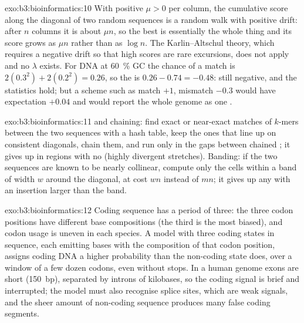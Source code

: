 \begin{solution}{exo:b3:bioinformatics:10}
With positive  $\mu > 0$ per column, the cumulative score
along the diagonal of two random sequences is a random walk with
positive drift: after $n$ columns it is about $\mu n$, so the best
 is essentially the whole thing and its score grows as
$\mu n$ rather than as $\log n$. The Karlin--Altschul theory, which
requires a negative drift so that high scores are rare excursions,
does not apply and no $\lambda$ exists. For DNA at \qty{60}{\%} GC the
chance of a match is $2(0.3^{2}) + 2(0.2^{2}) = 0.26$, so the  is $0.26 - 0.74 = -0.48$: still negative, and the statistics
hold; but a scheme such as match $+1$, mismatch $-0.3$ would have
expectation $+0.04$ and would report the whole genome as one .
\end{solution}

\begin{solution}{exo:b3:bioinformatics:11}
 and chaining: find exact or near-exact matches of $k$-mers between
the two sequences with a hash table, keep the ones that line up on
consistent diagonals, chain them, and run  only in
the gaps between chained ; it gives up  in regions with
no  (highly divergent stretches). Banding: if the two sequences are
known to be nearly collinear, compute only the cells within a band of
width $w$ around the diagonal, at cost $wn$ instead of $mn$; it gives
up any  with an insertion larger than the band.
\end{solution}

\begin{solution}{exo:b3:bioinformatics:12}
Coding sequence has a period of three: the three codon positions have
different base compositions (the third is the most biased), and codon
usage is uneven in each species. A model with three coding states in
sequence, each emitting bases with the composition of that codon
position, assigns coding DNA a higher probability than the non-coding
state does, over a window of a few dozen codons, even without stops.
In a human genome exons are short (\qty{150}{bp}), separated by introns
of kilobases, so the coding signal is brief and interrupted; the model
must also recognise splice sites, which are weak signals, and the
sheer amount of non-coding sequence produces many false coding
segments.
\end{solution}


